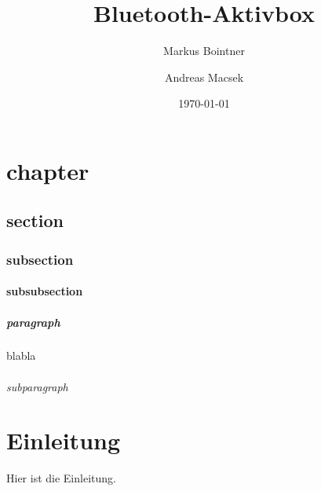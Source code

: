 \documentclass[paper=a4, 12pt]{scrreprt}
\title{Bluetooth-Aktivbox}
\author{Markus Bointner \and Andreas Macsek}
\date{\today}
\begin{document}
\frontmatter

\maketitle

\newpage\null\thispagestyle{empty}\newpage

\begin{affidavit}
\end{affidavit}




\tableofcontents

\mainmatter

\chapter{chapter}
\section{section}
\subsection{subsection}
\subsubsection{subsubsection}
\paragraph{paragraph}
blabla
\subparagraph{subparagraph}

\chapter{Einleitung}
	    Hier ist die Einleitung.
\end{document}
